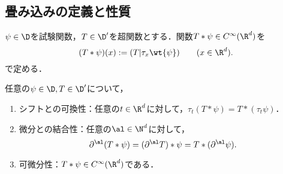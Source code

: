 \documentclass[uplatex,dvipdfmx]{jsreport}
\begin{document}
\subsection{畳み込みの定義と性質}

\begin{definition}[超関数と試験関数との畳み込み]
    $\psi\in\D$を試験関数，$T\in\D'$を超関数とする．関数$T*\psi\in C^\infty(\R^d)$を
    \[(T*\psi)(x):=(T|\tau_x\wt{\psi})\qquad(x\in\R^d).\]
    で定める．
\end{definition}

\begin{proposition}[シフトと微分と可換である]\label{prop-property-of-convolution-with-functions}
    任意の$\psi\in\D,T\in\D'$について，
    \begin{enumerate}
        \item シフトとの可換性：任意の$t\in\R^d$に対して，$\tau_t(T*\psi)=T*(\tau_t\psi)$．
        \item 微分との結合性：任意の$\al\in\N^d$に対して，
        \[\partial^\al(T*\psi)=(\partial^\al T)*\psi=T*(\partial^\al\psi).\]
        \item 可微分性：$T*\psi\in C^\infty(\R^d)$である．
    \end{enumerate}
\end{proposition}
\end{document}
